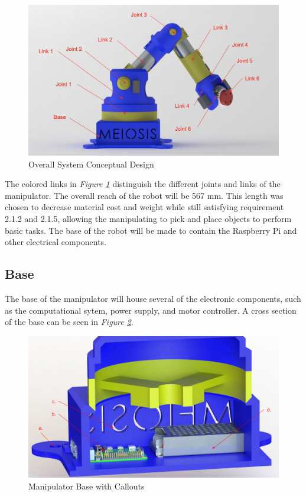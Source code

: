 \documentclass[12pt]{report}
\begin{document}
\begin{figure}[htp]
  \centering
  \includegraphics[frame, width=.75\textwidth]{overall_render}
  \caption{Overall System Conceptual Design }
  \label{fig:overall}
\end{figure}

The colored links in \emph{Figure \ref{fig:overall}} distinguish the different joints and links of the manipulator. The overall reach of the robot will be 567 mm. This length was chosen to decrease material cost and weight while still satisfying requirement 2.1.2 and 2.1.5, allowing the manipulating to pick and place objects to perform basic tasks. The base of the robot will be made to contain the Raspberry Pi and other electrical components.
\newpage
\subsection{Base}
The base of the manipulator will house several of the electronic components, such as the computational sytem, power supply, and motor controller. A cross section of the base can be seen in \emph{Figure \ref{fig:base}}.
\begin{figure}[htp]
  \centering
  \includegraphics[frame, width=.75\textwidth]{base_callouts}
  \caption{Manipulator Base with Callouts}
  \label{fig:base}
\end{figure}
\end{document}
